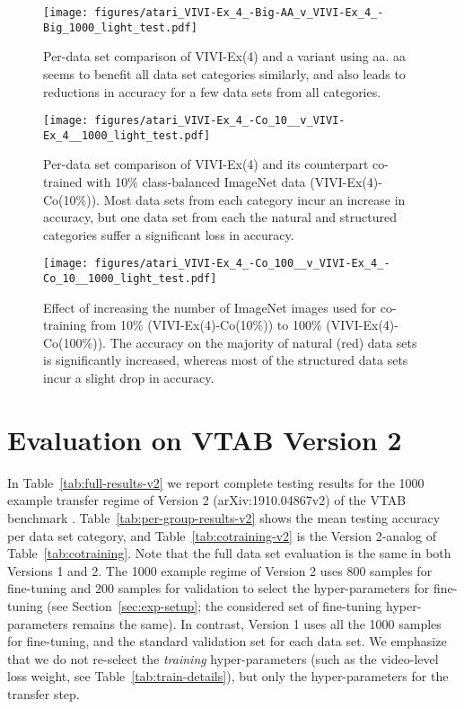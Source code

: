 \documentclass[10pt,twocolumn,letterpaper]{article}
\begin{document}
\begin{figure}[h]
\centering
\texttt{[image: figures/atari\_VIVI-Ex\_4\_-Big-AA\_v\_VIVI-Ex\_4\_-Big\_1000\_light\_test.pdf]}
\caption{Per-data set comparison of VIVI-Ex(4) and a variant using \gls{aa}. \gls{aa} seems to benefit all data set categories similarly, and also leads to reductions in accuracy for a few data sets from all categories.}
\label{fig:atari4}
\end{figure}

\begin{figure}[h]
\centering
\texttt{[image: figures/atari\_VIVI-Ex\_4\_-Co\_10\_\_v\_VIVI-Ex\_4\_\_1000\_light\_test.pdf]}
\caption{Per-data set comparison of VIVI-Ex(4) and its counterpart co-trained with 10\% class-balanced ImageNet data (VIVI-Ex(4)-Co(10\%)). Most data sets from each category incur an increase in accuracy, but one data set from each the natural and structured categories suffer a significant loss in accuracy.}
\label{fig:atari5}
\end{figure}

\begin{figure}[h]
\centering
\texttt{[image: figures/atari\_VIVI-Ex\_4\_-Co\_100\_\_v\_VIVI-Ex\_4\_-Co\_10\_\_1000\_light\_test.pdf]}
\caption{Effect of increasing the number of ImageNet images used for co-training from 10\% (VIVI-Ex(4)-Co(10\%)) to 100\% (VIVI-Ex(4)-Co(100\%)). The accuracy on the majority of natural (red) data sets is significantly increased, whereas most of the structured data sets incur a slight drop in accuracy.}
\label{fig:atari6}
\end{figure}

\FloatBarrier

\section{Evaluation on VTAB Version 2} \label{sec:vtab-v2}

In Table~\ref{tab:full-results-v2} we report complete testing results for the 1000 example transfer regime of Version 2 (arXiv:1910.04867v2) of the VTAB benchmark \cite{zhai2019visual}. Table~\ref{tab:per-group-results-v2} shows the mean testing accuracy per data set category, and Table~\ref{tab:cotraining-v2} is the Version 2-analog of Table~\ref{tab:cotraining}. Note that the full data set evaluation is the same in both Versions 1 and 2. The 1000 example regime of Version 2 uses 800 samples for fine-tuning and 200 samples for validation to select the hyper-parameters for fine-tuning (see Section~\ref{sec:exp-setup}; the considered set of fine-tuning hyper-parameters remains the same). In contrast, Version 1 uses all the 1000 samples for fine-tuning, and the standard validation set for each data set. We emphasize that we do not re-select the \emph{training} hyper-parameters (such as the video-level loss weight, see Table~\ref{tab:train-details}), but only the hyper-parameters for the transfer step.
\end{document}
